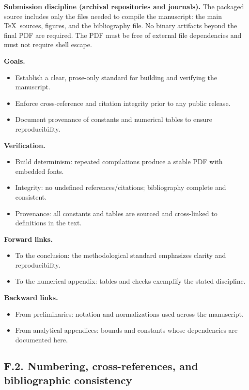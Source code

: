 \medskip
\noindent \textbf{Submission discipline (archival repositories and journals).}
The packaged source includes only the files needed to compile the manuscript: the main \TeX\ sources, figures, and the bibliography file. No binary artifacts beyond the final PDF are required. The PDF must be free of external file dependencies and must not require shell escape.

\medskip
\begin{auditblock}[F]
\textbf{Goals.}
\begin{itemize}
  \item Establish a clear, prose-only standard for building and verifying the manuscript.
  \item Enforce cross-reference and citation integrity prior to any public release.
  \item Document provenance of constants and numerical tables to ensure reproducibility.
\end{itemize}
\textbf{Verification.}
\begin{itemize}
  \item Build determinism: repeated compilations produce a stable PDF with embedded fonts.
  \item Integrity: no undefined references/citations; bibliography complete and consistent.
  \item Provenance: all constants and tables are sourced and cross-linked to definitions in the text.
\end{itemize}
\textbf{Forward links.}
\begin{itemize}
  \item To the conclusion: the methodological standard emphasizes clarity and reproducibility.
  \item To the numerical appendix: tables and checks exemplify the stated discipline.
\end{itemize}
\textbf{Backward links.}
\begin{itemize}
  \item From preliminaries: notation and normalizations used across the manuscript.
  \item From analytical appendices: bounds and constants whose dependencies are documented here.
\end{itemize}
\end{auditblock}

\subsection*{F.2. Numbering, cross-references, and bibliographic consistency}

